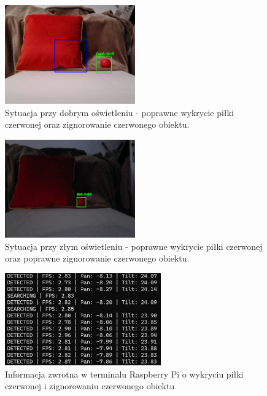 \documentclass[a4paper,twoside,12pt]{book}
\begin{document}
\begin{figure}[!hb]
    \centering
    \includegraphics[width=0.5\textwidth]{Images/Porownanie/Yolo7 robot/Zrzut ekranu 2025-01-02 194354.png}
    \caption{Sytuacja przy dobrym oświetleniu - poprawne wykrycie piłki czerwonej oraz zignorowanie czerwonego obiektu.}
    \label{fig:Wykrycie piłki3}
\end{figure}

\begin{figure}[!hb]
    \centering
    \includegraphics[width=0.5\textwidth]{Images/Porownanie/Yolo7 robot/Zrzut ekranu 2025-01-02 194641.png}
    \caption{Sytuacja przy złym oświetleniu - poprawne wykrycie piłki czerwonej oraz poprawne zignorowanie czerwonego obiektu.}
    \label{fig:Wykrycie piłki4}
\end{figure}


\begin{figure}[h]
    \centering
    \includegraphics[width=0.6\textwidth]{Images/Porownanie/Yolo7 robot/pilka i poduszka zgaszone swiatlo dalej wykrywa.png}
    \caption{Informacja zwrotna w terminalu Raspberry Pi o wykryciu piłki czerwonej i zignorowaniu czerwonego obiektu}
    \label{fig:Wykrycie piłki5}
\end{figure}
\end{document}
